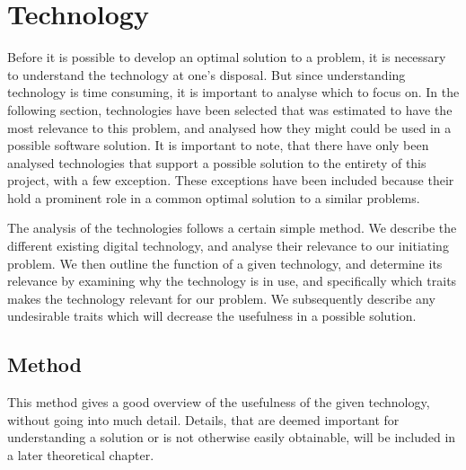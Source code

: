 
\section{Technology} \label{tech}


Before it is possible to develop an optimal solution to a problem, it is necessary to understand the technology at one's disposal. But since understanding technology is time consuming, it is important to analyse which to focus on. In the following section, technologies have been selected that was estimated to have the most relevance to this problem, and analysed how they might could be used in a possible software solution. It is important to note, that there have only been analysed technologies that support a possible solution to the entirety of this project, with a few exception. These exceptions have been included because their hold a prominent role in a common optimal solution to a similar problems.

The analysis of the technologies follows a certain simple method. We describe the different existing digital technology, and analyse their relevance to our initiating problem. We then outline the function of a given technology, and determine its relevance by examining why the technology is in use, and specifically which traits makes the technology relevant for our problem. We subsequently describe any undesirable traits which will decrease the usefulness in a possible solution.

\subsection{Method} \label{sub:techmethod}
This method gives a good overview of the usefulness of the given technology, without going into much detail. Details, that are deemed important for understanding a solution or is not otherwise easily obtainable, will be included in a later theoretical chapter.


